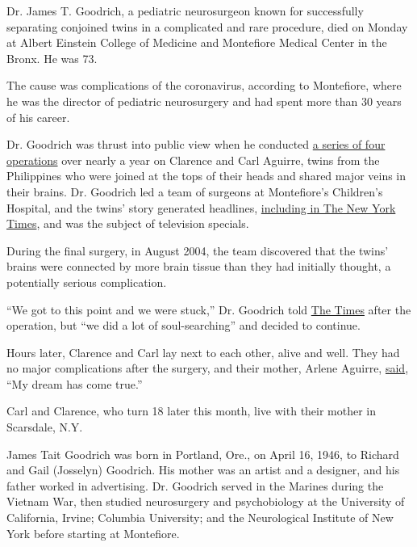 Dr. James T. Goodrich, a pediatric neurosurgeon known for successfully
separating conjoined twins in a complicated and rare procedure, died on
Monday at Albert Einstein College of Medicine and Montefiore Medical
Center in the Bronx. He was 73.

The cause was complications of the coronavirus, according to Montefiore,
where he was the director of pediatric neurosurgery and had spent more
than 30 years of his career.

Dr. Goodrich was thrust into public view when he conducted
\href{https://www.nytimes3xbfgragh.onion/2004/08/05/nyregion/surgeons-successfully-separate-conjoined-twins.html}{a
series of four operations} over nearly a year on Clarence and Carl
Aguirre, twins from the Philippines who were joined at the tops of their
heads and shared major veins in their brains. Dr. Goodrich led a team of
surgeons at Montefiore's Children's Hospital, and the twins' story
generated headlines,
\href{https://www.nytimes3xbfgragh.onion/2003/09/09/nyregion/surgeons-prepare-to-separate-conjoined-twins.html}{including
in The New York Times}, and was the subject of television specials.

During the final surgery, in August 2004, the team discovered that the
twins' brains were connected by more brain tissue than they had
initially thought, a potentially serious complication.

``We got to this point and we were stuck,'' Dr. Goodrich told
\href{https://www.nytimes3xbfgragh.onion/2004/08/06/nyregion/doctors-separate-twin-boys-despite-finding-brains-were-fused.html}{The
Times} after the operation, but ``we did a lot of soul-searching'' and
decided to continue.

Hours later, Clarence and Carl lay next to each other, alive and well.
They had no major complications after the surgery, and their mother,
Arlene Aguirre,
\href{https://www.nytimes3xbfgragh.onion/2004/08/10/nyregion/no-major-complications-for-separated-twins-doctors-say.html}{said},
``My dream has come true.''

Carl and Clarence, who turn 18 later this month, live with their mother
in Scarsdale, N.Y.

James Tait Goodrich was born in Portland, Ore., on April 16, 1946, to
Richard and Gail (Josselyn) Goodrich. His mother was an artist and a
designer, and his father worked in advertising. Dr. Goodrich served in
the Marines during the Vietnam War, then studied neurosurgery and
psychobiology at the University of California, Irvine; Columbia
University; and the Neurological Institute of New York before starting
at Montefiore.

